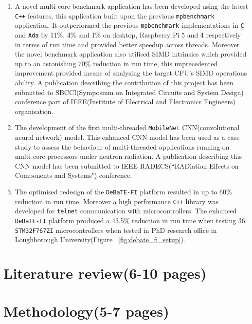 \documentclass[12pt, openany]{book}
\begin{document}
\begin{enumerate}
	\item A novel multi-core benchmark application has been developed using the latest \texttt{C++} features, this application built upon the previous \texttt{mpbenchmark}\cite{mpbenchmark_paper} application. It outperformed the previous \texttt{mpbenchmark} implementations in \texttt{C} and \texttt{Ada} by 11\%, 4\% and 1\% on desktop, Raspberry Pi 5 and 4 respectively in terms of run time and provided better speedup across threads. Moreover the novel benchmark application also utilised SIMD intrinsics which provided up to an astonishing 70\% reduction in run time, this unprecedented improvement provided means of analysing the target CPU's SIMD operations ability. A publication describing the contribution of this project has been submitted to SBCCI(Symposium on Integrated Circuits and System Design) conference part of IEEE(Institute of Electrical and Electronics Engineers) organisation. 
	
	\item The development of the first multi-threaded \texttt{MobileNet} CNN(convolutional neural network) model. This enhanced CNN model has been used as a case study to assess the behaviour of multi-threaded applications running on multi-core processors under neutron radiation. A publication describing this CNN model has been submitted to IEEE RADECS(``RADiation Effects on Components and Systems") conference.
	
	\item The optimised redesign of the \texttt{DeBaTE-FI} platform\cite{debate_fi_publication} resulted in up to 60\% reduction in run time. Moreover a high performance \texttt{C++} library was developed for \texttt{telnet} communication with microcontrollers. The enhanced \texttt{DeBaTE-FI} platform produced a 43.5\% reduction in run time when testing 36 \texttt{STM32F767ZI} microcontrollers when tested in PhD research office in Loughborough University(Figure ~\ref{fig:debate_fi_setup}).
\end{enumerate}


\chapter{Literature review(6-10 pages)}



\chapter{Methodology(5-7 pages)}

\end{document}
